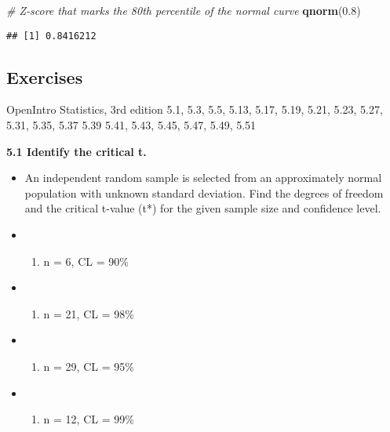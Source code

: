 \documentclass[]{book}
\newenvironment{Shaded}{\begin{snugshade}}{\end{snugshade}}
\newcommand{\CommentTok}[1]{\textcolor[rgb]{0.56,0.35,0.01}{\textit{#1}}}
\newcommand{\FloatTok}[1]{\textcolor[rgb]{0.00,0.00,0.81}{#1}}
\newcommand{\KeywordTok}[1]{\textcolor[rgb]{0.13,0.29,0.53}{\textbf{#1}}}
\newcommand{\NormalTok}[1]{#1}
\providecommand{\tightlist}{%
  \setlength{\itemsep}{0pt}\setlength{\parskip}{0pt}}
\begin{document}
\begin{Shaded}
\begin{Highlighting}[]
\CommentTok{# Z-score that marks the 80th percentile of the normal curve}
\KeywordTok{qnorm}\NormalTok{(}\FloatTok{0.8}\NormalTok{)}
\end{Highlighting}
\end{Shaded}

\begin{verbatim}
## [1] 0.8416212
\end{verbatim}

\hypertarget{exercises-4}{%
\subsection*{Exercises}\label{exercises-4}}

OpenIntro Statistics, 3rd edition
5.1, 5.3, 5.5, 5.13, 5.17, 5.19, 5.21, 5.23, 5.27, 5.31, 5.35, 5.37
5.39
5.41, 5.43, 5.45, 5.47, 5.49, 5.51

\textbf{5.1 Identify the critical t.}

\begin{itemize}
\item
  An independent random sample is selected from an approximately normal population with unknown standard deviation. Find the degrees of freedom and the critical t-value (t*) for the given sample size and confidence level.
\item
  \begin{enumerate}
  \def\labelenumi{(\alph{enumi})}
  \tightlist
  \item
    n = 6, CL = 90\%
  \end{enumerate}
\item
  \begin{enumerate}
  \def\labelenumi{(\alph{enumi})}
  \setcounter{enumi}{1}
  \tightlist
  \item
    n = 21, CL = 98\%
  \end{enumerate}
\item
  \begin{enumerate}
  \def\labelenumi{(\alph{enumi})}
  \setcounter{enumi}{2}
  \tightlist
  \item
    n = 29, CL = 95\%
  \end{enumerate}
\item
  \begin{enumerate}
  \def\labelenumi{(\alph{enumi})}
  \setcounter{enumi}{3}
  \tightlist
  \item
    n = 12, CL = 99\%
  \end{enumerate}
\end{itemize}
\end{document}
